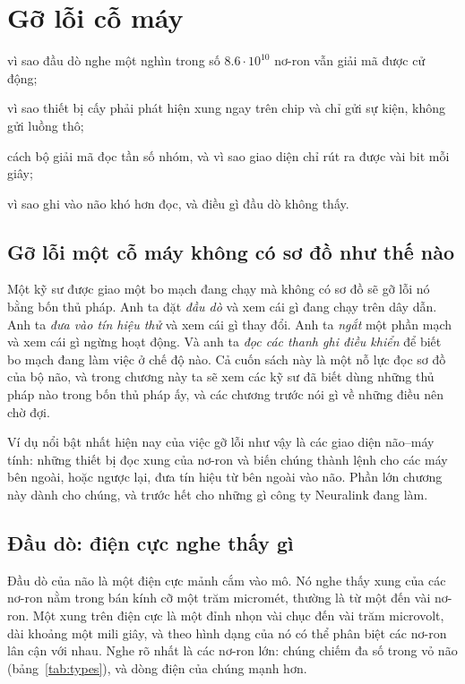 \chapter{Gỡ lỗi cỗ máy}
\label{sec:debugging}
\begin{chaptergoals}
\item vì sao đầu dò nghe một nghìn trong số $8.6\cdot10^{10}$ nơ-ron vẫn giải mã được cử động;
\item vì sao thiết bị cấy phải phát hiện xung ngay trên chip và chỉ gửi sự kiện, không gửi luồng thô;
\item cách bộ giải mã đọc tần số nhóm, và vì sao giao diện chỉ rút ra được vài bit mỗi giây;
\item vì sao ghi vào não khó hơn đọc, và điều gì đầu dò không thấy.
\end{chaptergoals}

\section{Gỡ lỗi một cỗ máy không có sơ đồ như thế nào}

Một kỹ sư được giao một bo mạch đang chạy mà không có sơ đồ sẽ gỡ lỗi nó bằng bốn thủ pháp. Anh ta đặt \emph{đầu dò} và xem cái gì đang chạy trên dây dẫn. Anh ta \emph{đưa vào tín hiệu thử} và xem cái gì thay đổi. Anh ta \emph{ngắt} một phần mạch và xem cái gì ngừng hoạt động. Và anh ta \emph{đọc các thanh ghi điều khiển} để biết bo mạch đang làm việc ở chế độ nào. Cả cuốn sách này là một nỗ lực đọc sơ đồ của bộ não, và trong chương này ta sẽ xem các kỹ sư đã biết dùng những thủ pháp nào trong bốn thủ pháp ấy, và các chương trước nói gì về những điều nên chờ đợi.

Ví dụ nổi bật nhất hiện nay của việc gỡ lỗi như vậy là các giao diện não--máy tính: những thiết bị đọc xung của nơ-ron và biến chúng thành lệnh cho các máy bên ngoài, hoặc ngược lại, đưa tín hiệu từ bên ngoài vào não. Phần lớn chương này dành cho chúng, và trước hết cho những gì công ty Neuralink đang làm.

\section{Đầu dò: điện cực nghe thấy gì}

Đầu dò của não là một điện cực mảnh cắm vào mô. Nó nghe thấy xung của các nơ-ron nằm trong bán kính cỡ một trăm micromét, thường là từ một đến vài nơ-ron. Một xung trên điện cực là một đỉnh nhọn vài chục đến vài trăm microvolt, dài khoảng một mili giây, và theo hình dạng của nó có thể phân biệt các nơ-ron lân cận với nhau. Nghe rõ nhất là các nơ-ron  lớn: chúng chiếm đa số trong vỏ não (bảng~\ref{tab:types}), và dòng điện của chúng mạnh hơn.

